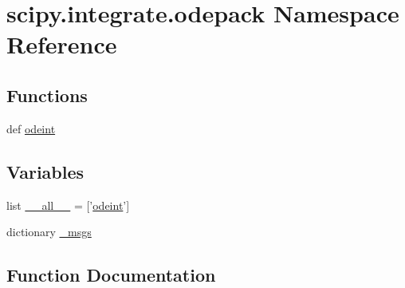 \hypertarget{namespacescipy_1_1integrate_1_1odepack}{}\section{scipy.\+integrate.\+odepack Namespace Reference}
\label{namespacescipy_1_1integrate_1_1odepack}
\subsection*{Functions}
\begin{DoxyCompactItemize}
\item 
def \hyperlink{namespacescipy_1_1integrate_1_1odepack_a75ac8bdddc045d5a5b17d5a67855cd4d}{odeint}
\end{DoxyCompactItemize}
\subsection*{Variables}
\begin{DoxyCompactItemize}
\item 
list \hyperlink{namespacescipy_1_1integrate_1_1odepack_afb01c38a5ee4953c8478391c54928657}{\+\_\+\+\_\+all\+\_\+\+\_\+} = \mbox{[}'\hyperlink{namespacescipy_1_1integrate_1_1odepack_a75ac8bdddc045d5a5b17d5a67855cd4d}{odeint}'\mbox{]}
\item 
dictionary \hyperlink{namespacescipy_1_1integrate_1_1odepack_a3b4d226ec6e747da298f41381a32e592}{\+\_\+msgs}
\end{DoxyCompactItemize}


\subsection{Function Documentation}
\hypertarget{namespacescipy_1_1integrate_1_1odepack_a75ac8bdddc045d5a5b17d5a67855cd4d}{}
